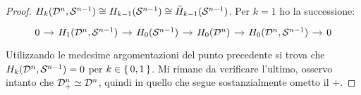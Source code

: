 \begin{proof}
  $ H_k(\mathcal{D}^{n}, \mathcal{S}^{n-1}) \cong H_{k-1}(\mathcal{S}^{n-1}) \cong \tilde{H}_{k-1}(\mathcal{S}^{n-1}) $.
  Per $ k = 1 $ ho la successione:
  \[
    \begin{tikzcd}[nodes={column sep=10pt}]
      0 \rar & H_1(\Disk{n}, \Sph{n-1}) \rar & H_0(\Sph{n-1}) \rar & H_0(\Disk{n}) \rar & H_0(\Disk{n}, \Sph{n-1}) \rar & 0
    \end{tikzcd}
  \]
  Utilizzando le medesime argomentazioni del punto precedente si trova che
  $ H_k(\mathcal{D}^{n}, \mathcal{S}^{n-1}) = 0 $ per $ k \in \set{0,1} $.
  Mi rimane da verificare l'ultimo, osservo intanto che $ \mathcal{D}^{n}_+ \simeq \mathcal{D}^{n} $,
  quindi in quello che segue sostanzialmente ometto il $ + $.


\end{proof}
